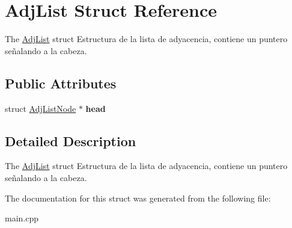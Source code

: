 \hypertarget{struct_adj_list}{}\section{Adj\+List Struct Reference}
\label{struct_adj_list}


The \hyperlink{struct_adj_list}{Adj\+List} struct Estructura de la lista de adyacencia, contiene un puntero señalando a la cabeza.  


\subsection*{Public Attributes}
\begin{DoxyCompactItemize}
\item 
\mbox{\label{struct_adj_list_a4f2ab2ed8e90ceae8bf50373e4e97e87}} 
struct \hyperlink{struct_adj_list_node}{Adj\+List\+Node} $\ast$ {\bfseries head}
\end{DoxyCompactItemize}


\subsection{Detailed Description}
The \hyperlink{struct_adj_list}{Adj\+List} struct Estructura de la lista de adyacencia, contiene un puntero señalando a la cabeza. 

The documentation for this struct was generated from the following file\+:\begin{DoxyCompactItemize}
\item 
main.\+cpp\end{DoxyCompactItemize}
